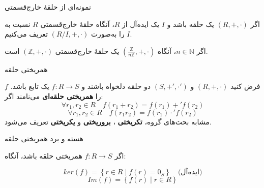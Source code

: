 \begin{frame}[t]{نمونه‌ای از حلقهٔ خارج‌قسمتی}
    \begin{definition}
        اگر $(R, +, \cdot)$ یک حلقه باشد و $I$ یک ایده‌آل از $R$، آنگاه حلقهٔ خارج‌قسمتی $R$ نسبت به $I$ را به‌صورت $(R/I, +, \cdot)$ تعریف می‌کنیم.

    \end{definition}



    \begin{example}
        اگر $n \in \mathbb{N}$، آنگاه $( \frac{\mathbb{Z}}{n\mathbb{Z}}, +, \cdot)$ یک حلقهٔ خارج‌قسمتی $( \mathbb{Z}, +, \cdot)$
        است.
    \end{example}


    \end{frame}

\begin{frame}[t]{همریختی حلقه}
    \begin{definition}
        فرض کنید $(R,+,\cdot)$ و $(S,+',\cdot')$ دو حلقه دلخواه باشند و $f \colon R \to S$ یک تابع باشد. $f$ را \textbf{همریختی حلقه‌ای} می‌نامند اگر:
        \[
            \forall r_1, r_2 \in R \quad f(r_1 + r_2) = f(r_1) +' f(r_2)
        \]
        \[
            \forall r_1, r_2 \in R \quad f(r_1 r_2) = f(r_1) \cdot' f(r_2)
        \]
        مشابه بحث‌های گروه، \textbf{تکریختی} ، \textbf{بروریختی} و \textbf{یکریختی} تعریف می‌شود.
    \end{definition}

\end{frame}


\begin{frame}[t]{هسته و برد همریختی حلقه}
    \begin{definition}
        اگر $f \colon R \to S$ همریختی حلقه باشد، آنگاه:

        \[
            ker(f) = \left\{ r \in R \mid f(r) = 0_S \right\} \quad \text{(ایده‌آل)}
        \]
        \[
            Im(f) = \left\{ f(r) \mid r \in R \right\}
        \]
    \end{definition}


\end{frame}

